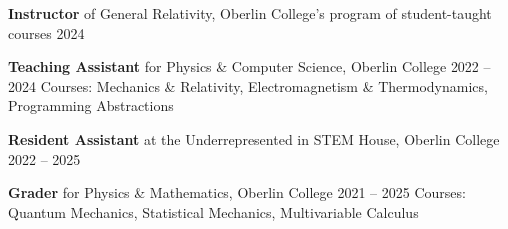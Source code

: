 \entryItem
	{{\bf Instructor} of General Relativity, Oberlin College's program of student-taught courses}
	{2024}
\begin{entry}
	{{\bf Teaching Assistant} for Physics \& Computer Science, Oberlin College}
	{2022 -- 2024}
	Courses: Mechanics \& Relativity, Electromagnetism \& Thermodynamics, Programming Abstractions
\end{entry}
\entryItem
	{{\bf Resident Assistant} at the Underrepresented in STEM House, Oberlin College}
	{2022 -- 2025}
\begin{entry}
	{{\bf Grader} for Physics \& Mathematics, Oberlin College}
	{2021 -- 2025}
	Courses: Quantum Mechanics, Statistical Mechanics, Multivariable Calculus
\end{entry}
